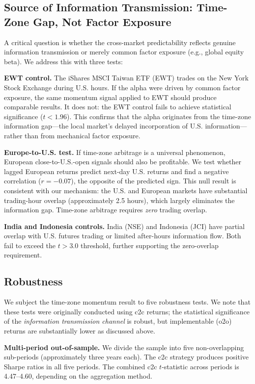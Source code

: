 \subsection{Source of Information Transmission: Time-Zone Gap, Not Factor Exposure}

A critical question is whether the cross-market predictability reflects genuine information transmission or merely common factor exposure (e.g., global equity beta). We address this with three tests:

\textbf{EWT control.} The iShares MSCI Taiwan ETF (EWT) trades on the New York Stock Exchange during U.S. hours. If the alpha were driven by common factor exposure, the same momentum signal applied to EWT should produce comparable results. It does not: the EWT control fails to achieve statistical significance ($t < 1.96$). This confirms that the alpha originates from the time-zone information gap---the local market's delayed incorporation of U.S. information---rather than from mechanical factor exposure.

\textbf{Europe-to-U.S. test.} If time-zone arbitrage is a universal phenomenon, European close-to-U.S.-open signals should also be profitable. We test whether lagged European returns predict next-day U.S. returns and find a negative correlation ($r = -0.07$), the opposite of the predicted sign. This null result is consistent with our mechanism: the U.S. and European markets have substantial trading-hour overlap (approximately 2.5 hours), which largely eliminates the information gap. Time-zone arbitrage requires \textit{zero} trading overlap.

\textbf{India and Indonesia controls.} India (NSE) and Indonesia (JCI) have partial overlap with U.S. futures trading or limited after-hours information flow. Both fail to exceed the $t > 3.0$ threshold, further supporting the zero-overlap requirement.

\subsection{Robustness}

We subject the time-zone momentum result to five robustness tests. We note that these tests were originally conducted using c2c returns; the statistical significance of the \textit{information transmission channel} is robust, but implementable (o2o) returns are substantially lower as discussed above.

\textbf{Multi-period out-of-sample.} We divide the sample into five non-overlapping sub-periods (approximately three years each). The c2c strategy produces positive Sharpe ratios in all five periods. The combined c2c $t$-statistic across periods is 4.47--4.60, depending on the aggregation method.

